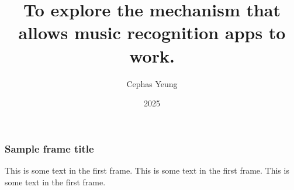 \documentclass{beamer}
\title{To explore the mechanism that allows music recognition apps to work. }
\author{Cephas Yeung}
\date{2025}
\begin{document}
\frame{\titlepage}

\begin{frame}
\frametitle{Sample frame title}
This is some text in the first frame. This is some text in the first frame. This is some text in the first frame.
\end{frame}
\end{document}
